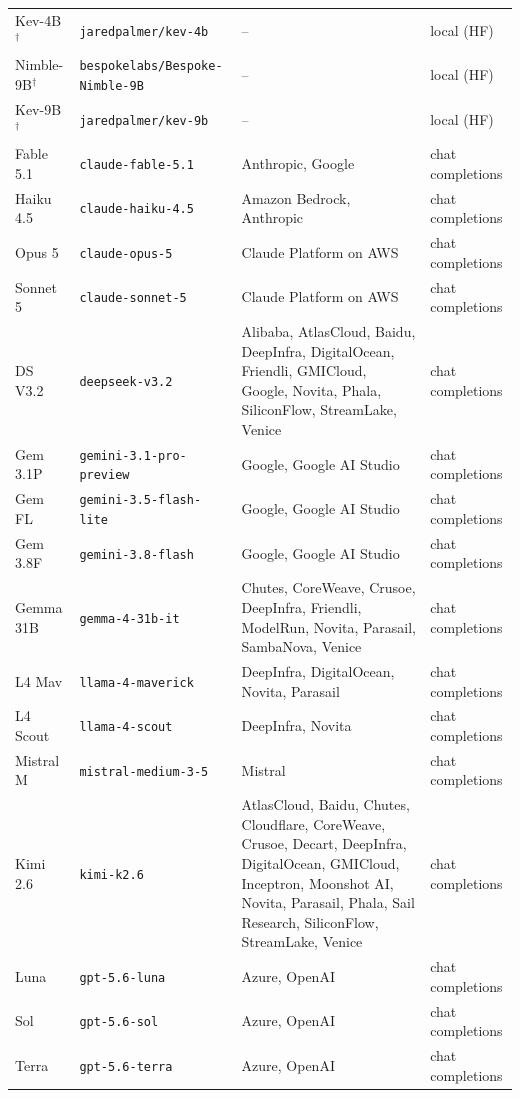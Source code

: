 \begin{longtable}{@{}l >{\raggedright\arraybackslash}p{} >{\raggedright\arraybackslash}p{} l@{}}
Kev-4B$^{\dagger}$ & \texttt{jaredpalmer/kev-4b} & -- & local (HF) \\
Nimble-9B$^{\dagger}$ & \texttt{bespokelabs/\allowbreak Bespoke-Nimb\allowbreak le-9B} & -- & local (HF) \\
Kev-9B$^{\dagger}$ & \texttt{jaredpalmer/kev-9b} & -- & local (HF) \\
Fable 5.1 & \texttt{claude-fable-5.1} & Anthropic, Google & chat completions \\
Haiku 4.5 & \texttt{claude-haiku-4.5} & Amazon Bedrock, Anthropic & chat completions \\
Opus 5 & \texttt{claude-opus-5} & Claude Platform on AWS & chat completions \\
Sonnet 5 & \texttt{claude-sonnet-5} & Claude Platform on AWS & chat completions \\
DS V3.2 & \texttt{deepseek-v3.2} & Alibaba, AtlasCloud, Baidu, DeepInfra, DigitalOcean, Friendli, GMICloud, Google, Novita, Phala, SiliconFlow, StreamLake, Venice & chat completions \\
Gem 3.1P & \texttt{gemini-3.1-pro-preview} & Google, Google AI Studio & chat completions \\
Gem FL & \texttt{gemini-3.5-flash-lite} & Google, Google AI Studio & chat completions \\
Gem 3.8F & \texttt{gemini-3.8-flash} & Google, Google AI Studio & chat completions \\
Gemma 31B & \texttt{gemma-4-31b-it} & Chutes, CoreWeave, Crusoe, DeepInfra, Friendli, ModelRun, Novita, Parasail, SambaNova, Venice & chat completions \\
L4 Mav & \texttt{llama-4-maverick} & DeepInfra, DigitalOcean, Novita, Parasail & chat completions \\
L4 Scout & \texttt{llama-4-scout} & DeepInfra, Novita & chat completions \\
Mistral M & \texttt{mistral-medium-3-5} & Mistral & chat completions \\
Kimi 2.6 & \texttt{kimi-k2.6} & AtlasCloud, Baidu, Chutes, Cloudflare, CoreWeave, Crusoe, Decart, DeepInfra, DigitalOcean, GMICloud, Inceptron, Moonshot AI, Novita, Parasail, Phala, Sail Research, SiliconFlow, StreamLake, Venice & chat completions \\
Luna & \texttt{gpt-5.6-luna} & Azure, OpenAI & chat completions \\
Sol & \texttt{gpt-5.6-sol} & Azure, OpenAI & chat completions \\
Terra & \texttt{gpt-5.6-terra} & Azure, OpenAI & chat completions \\

\end{longtable}
